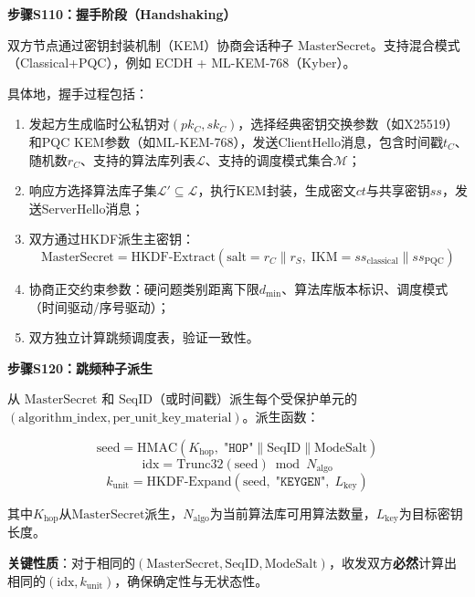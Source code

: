 \documentclass[12pt,a4paper]{article}
\begin{document}
\textbf{步骤S110：握手阶段（Handshaking）}

双方节点通过密钥封装机制（KEM）协商会话种子 $\text{MasterSecret}$。支持混合模式（Classical+PQC），例如 ECDH + ML-KEM-768（Kyber）。

具体地，握手过程包括：
\begin{enumerate}[label=S110.\arabic*]
    \item 发起方生成临时公私钥对$(pk_C, sk_C)$，选择经典密钥交换参数（如X25519）和PQC KEM参数（如ML-KEM-768），发送ClientHello消息，包含时间戳$t_C$、随机数$r_C$、支持的算法库列表$\mathcal{L}$、支持的调度模式集合$\mathcal{M}$；
    \item 响应方选择算法库子集$\mathcal{L}' \subseteq \mathcal{L}$，执行KEM封装，生成密文$ct$与共享密钥$ss$，发送ServerHello消息；
    \item 双方通过HKDF派生主密钥：
    \begin{equation}
        \text{MasterSecret} = \text{HKDF-Extract}(\text{salt}=r_C \| r_S,\; \text{IKM}=ss_{\text{classical}} \| ss_{\text{PQC}})
    \end{equation}
    \item 协商正交约束参数：硬问题类别距离下限$d_{\min}$、算法库版本标识、调度模式（时间驱动/序号驱动）；
    \item 双方独立计算跳频调度表，验证一致性。
\end{enumerate}

\textbf{步骤S120：跳频种子派生}

从 $\text{MasterSecret}$ 和 $\text{SeqID}$（或时间戳）派生每个受保护单元的 $(\text{algorithm\_index}, \text{per\_unit\_key\_material})$。派生函数：

\begin{equation}\label{eq:derive}
    \text{seed} = \text{HMAC}(K_{\text{hop}}, \; \texttt{"HOP"} \| \text{SeqID} \| \text{ModeSalt})
\end{equation}
\begin{equation}\label{eq:idx}
    \text{idx} = \text{Trunc32}(\text{seed}) \bmod N_{\text{algo}}
\end{equation}
\begin{equation}\label{eq:key}
    k_{\text{unit}} = \text{HKDF-Expand}(\text{seed}, \; \texttt{"KEYGEN"}, \; L_{\text{key}})
\end{equation}

其中$K_{\text{hop}}$从$\text{MasterSecret}$派生，$N_{\text{algo}}$为当前算法库可用算法数量，$L_{\text{key}}$为目标密钥长度。

\textbf{关键性质}：对于相同的$(\text{MasterSecret}, \text{SeqID}, \text{ModeSalt})$，收发双方\textbf{必然}计算出相同的$(\text{idx}, k_{\text{unit}})$，确保确定性与无状态性。
\end{document}
